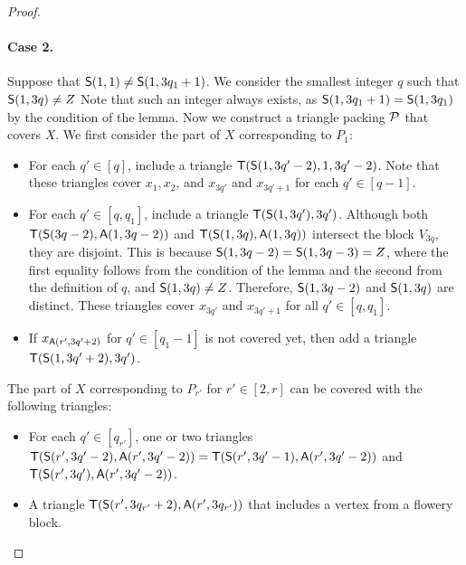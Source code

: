 \begin{proof}
  \paragraph{Case 2.}
  Suppose that $\mathsf{S}(1, 1) \ne \mathsf{S}(1, 3q_{1} + 1)$.
  We consider the smallest integer $q$ such that $\mathsf{S}(1, 3q) \ne Z$
  Note that such an integer always exists, as $\mathsf{S}(1, 3q_{1} + 1) = \mathsf{S}(1, 3q_{1})$ by the condition of the lemma.
  Now we construct a triangle packing $\mathcal P$ that covers $X$.
  We first consider the part of $X$ corresponding to $P_1$:
  \begin{itemize}
    \item For each $q' \in [q]$, include a triangle $\mathsf{T}(\mathsf{S}(1, 3q'-2), 1, 3q'-2)$.
    Note that these triangles cover $x_{1}, x_{2}$, and $x_{3q'}$ and $x_{3q'+1}$ for each $q' \in [q-1]$.
    \item For each $q' \in [q, q_{1}]$, include a triangle $\mathsf{T}(\mathsf{S}(1, 3q'), 3q')$.
    Although both $\mathsf{T}(\mathsf{S}(3q-2), \mathsf{A}(1, 3q-2))$ and $\mathsf{T}(\mathsf{S}(1, 3q), \mathsf{A}(1, 3q))$ intersect the block $V_{3q}$, they are disjoint.
    This is because $\mathsf{S}(1, 3q-2) = \mathsf{S}(1, 3q-3) = Z$, where the first equality follows from the condition of the lemma and the second from the definition of $q$, and $\mathsf{S}(1, 3q) \ne Z$.
    Therefore, $\mathsf{S}(1,3q-2)$ and $\mathsf{S}(1,3q)$ are distinct.
    These triangles cover $x_{3q'}$ and $x_{3q'+1}$ for all $q' \in [q, q_{1}]$.
    \item 
    If $x_{\mathsf{A}(r',3q'+2)}$ for $q' \in [q_1 - 1]$ is not covered yet, then add a triangle $\mathsf{T}(\mathsf{S}(1, 3q'+2), 3q')$.
  \end{itemize}
  The part of $X$ corresponding to $P_{r'}$ for $r' \in [2, r]$ can be covered with the following triangles:
  \begin{itemize}
    \item For each $q' \in [q_{r'}]$, one or two triangles $\mathsf{T}(\mathsf{S}(r', 3q' - 2), \mathsf{A}(r', 3q' - 2)) = \mathsf{T}(\mathsf{S}(r', 3q' - 1), \mathsf{A}(r', 3q' - 2))$ and $\mathsf{T}(\mathsf{S}(r', 3q'), \mathsf{A}(r', 3q' - 2))$.
    \item A triangle $\mathsf{T}(\mathsf{S}(r', 3q_{r'} + 2), \mathsf{A}(r', 3q_{r'}))$ that includes a vertex from a flowery block.
  \end{itemize}


\end{proof}

